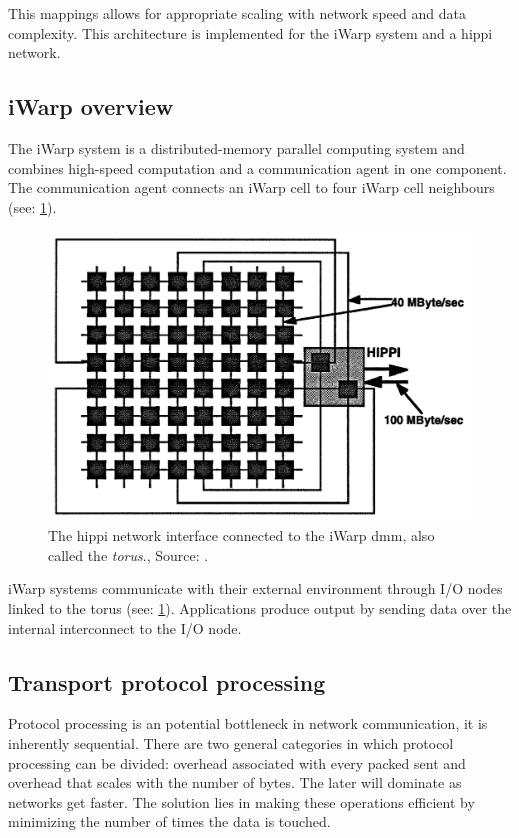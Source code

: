 This mappings allows for appropriate scaling with network speed and data complexity.
This architecture is implemented for the iWarp system and a \ac{hippi} network.

\subsection{iWarp overview}
The iWarp system is a distributed-memory parallel computing system and combines high-speed computation and a communication agent in one component.
The communication agent connects an iWarp cell to four iWarp cell neighbours (see: \cref{fig:rep4:torus}).

\begin{figure}
    \centering
	\includegraphics[width=0.95\linewidth]{Figures/Rep4torus.png}
	\caption{The \ac{hippi} network interface connected to the iWarp \ac{dmm}, also called the \textit{torus}., Source: \cite{steenkiste1997high}.} 
    \label{fig:rep4:torus}
\end{figure}

iWarp systems communicate with their external environment through I/O nodes linked to the torus (see: \cref{fig:rep4:torus}).
Applications produce output by sending data over the internal interconnect to the I/O node.

\subsection{Transport protocol processing}
Protocol processing is an potential bottleneck in network communication, it is inherently sequential.
There are two general categories in which protocol processing can be divided: overhead associated with every packed sent and overhead that scales with the number of bytes.
The later will dominate as networks get faster.
The solution lies in making these operations efficient by minimizing the number of times the data is touched.


